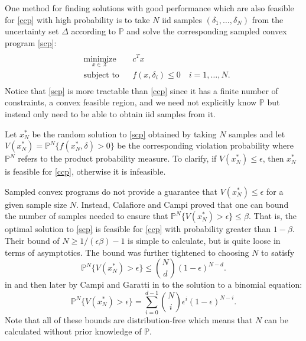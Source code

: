 \documentclass[12pt]{article}
\begin{document}
One method for finding solutions with good performance which are also feasible for \ref{ccp} with high probability is to take $N$ iid samples $(\delta_1, \ldots, \delta_N)$ from the uncertainty set $\Delta$ according to $\mathbb{P}$ and solve the corresponding sampled convex program \ref{scp}:
\begin{align}\label{scp}
\begin{split}
\begin{aligned}
    & \underset{x \in \mathcal{X}}{\text{minimize}}
    & & c^T x \\
    & \text{subject to}
    & & f(x,\delta_i) \leq 0 \quad i = 1, \ldots, N.
\end{aligned}
\end{split} \tag{SCP$_N$}
\end{align}
Notice that \ref{scp} is more tractable than \ref{ccp} since it has a finite number of constraints, a convex feasible region, and we need not explicitly know $\mathbb{P}$ but instead only need to be able to obtain iid samples from it.

Let $x_N^*$ be the random solution to \ref{scp} obtained by taking $N$ samples and let $V(x_N^*) = \mathbb{P}^N\{f(x_N^*, \delta) > 0\}$ be the corresponding violation probability where $\mathbb{P}^N$ refers to the product probability measure.
To clarify, if $V(x_N^*) \leq \epsilon$, then $x_N^*$ is feasible for \ref{ccp}, otherwise it is infeasible.

Sampled convex programs do not provide a guarantee that $V(x_N^*) \leq \epsilon$ for a given sample size $N$.
Instead, Calafiore and Campi \cite{campi05} proved that one can bound the number of samples needed to ensure that $\mathbb{P}^N\{V(x_N^*) > \epsilon\} \leq \beta$.
That is, the optimal solution to \ref{scp} is feasible for \ref{ccp} with probability greater than $1 - \beta$.
Their bound of $N \geq 1/(\epsilon\beta) - 1$ is simple to calculate, but is quite loose in terms of asymptotics.
The bound was further tightened to choosing $N$ to satisfy
\[ \mathbb{P}^N\{V(x_N^*) > \epsilon\} \leq \binom{N}{d}(1-\epsilon)^{N-d}. \]
in \cite{campi06} and then later by Campi and Garatti in \cite{campi08} to the solution to a binomial equation:
\[ \mathbb{P}^N\{V(x_N^*) > \epsilon\} = \sum_{i=0}^{d-1} \binom{N}{i} \epsilon^i (1-\epsilon)^{N-i}. \]
Note that all of these bounds are distribution-free which means that $N$ can be calculated without prior knowledge of $\mathbb{P}$.
\end{document}
